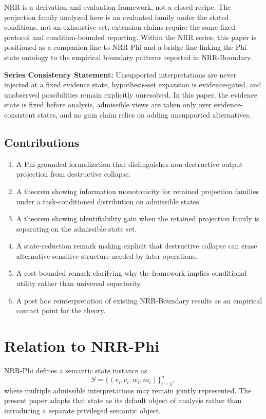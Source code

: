 \documentclass[11pt,a4paper]{article}
\begin{document}
NRR is a derivation-and-evaluation framework, not a closed recipe.
The projection family analyzed here is an evaluated family under the stated conditions, not an exhaustive set; extension claims require the same fixed protocol and condition-bounded reporting.
Within the NRR series, this paper is positioned as a companion line to NRR-Phi and a bridge line linking the Phi state ontology to the empirical boundary patterns reported in NRR-Boundary.

\textbf{Series Consistency Statement:}
Unsupported interpretations are never injected at a fixed evidence state, hypothesis-set expansion is evidence-gated, and unobserved possibilities remain explicitly unresolved. In this paper, the evidence state is fixed before analysis, admissible views are taken only over evidence-consistent states, and no gain claim relies on adding unsupported alternatives.

\subsection{Contributions}

\begin{enumerate}
  \item A Phi-grounded formalization that distinguishes non-destructive output projection from destructive collapse.
  \item A theorem showing information monotonicity for retained projection families under a task-conditioned distribution on admissible states.
  \item A theorem showing identifiability gain when the retained projection family is separating on the admissible state set.
  \item A state-reduction remark making explicit that destructive collapse can erase alternative-sensitive structure needed by later operations.
  \item A cost-bounded remark clarifying why the framework implies conditional utility rather than universal superiority.
  \item A post hoc reinterpretation of existing NRR-Boundary results \cite{saito2026boundary} as an empirical contact point for the theory.
\end{enumerate}

\section{Relation to NRR-Phi}
\label{sec:phi}

NRR-Phi \cite{saito2026phi} defines a semantic state instance as
\begin{equation}
S = \{(v_i, c_i, w_i, m_i)\}_{i=1}^{n},
\end{equation}
where multiple admissible interpretations may remain jointly represented. The present paper adopts that state as its default object of analysis rather than introducing a separate privileged semantic object.
\end{document}
